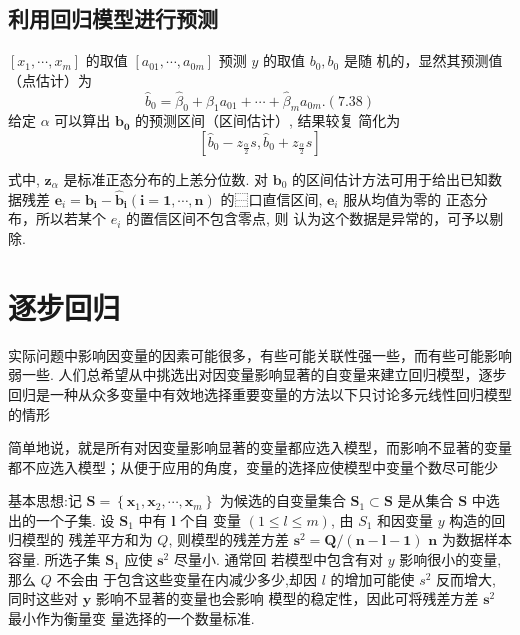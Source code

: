 \subsection{利用回归模型进行预测}

\( \left[x_{1}, \cdots, x_{m}\right] \) 的取值 \( \left[a_{01}, \cdots, a_{0 m}\right] \) 预测 \( y \) 的取值 \( b_{0}, b_{0} \) 是随 机的，显然其预测值（点估计）为
$$
\hat{b}_{0}=\hat{\beta}_{0}+\hat{\beta}_{1} a_{01}+\cdots+\hat{\beta}_{m} a_{0 m} .(7.38)
$$
给定 \( \alpha \) 可以算出 \( \boldsymbol{b}_{\mathbf{0}} \) 的预测区间（区间估计）, 结果较复
简化为
$$
\left[\hat{b}_{0}-z_{\frac{\alpha}{2}} s, \hat{b}_{0}+z_{\frac{\alpha}{2}} s\right]
$$

式中, \( \boldsymbol{z}_{\alpha} \) 是标准正态分布的上恙分位数. 
对 \( \boldsymbol{b}_{0} \) 的区间估计方法可用于给出已知数据残差 \( \boldsymbol{e}_{i}=\boldsymbol{b}_{\boldsymbol{i}}-\hat{\boldsymbol{b}}_{\boldsymbol{i}}(\boldsymbol{i}=\mathbf{1}, \cdots, \boldsymbol{n}) \) 的⿱口直信区间, \( \boldsymbol{e}_{i} \) 服从均值为零的
正态分布，所以若某个 \( e_{i} \) 的置信区间不包含零点, 则 认为这个数据是异常的，可予以剔除. 

\section{逐步回归}

实际问题中影响因变量的因素可能很多，有些可能关联性强一些，而有些可能影响弱一些. 人们总希望从中挑选出对因变量影响显著的自变量来建立回归模型，逐步回归是一种从众多变量中有效地选择重要变量的方法以下只讨论多元线性回归模型的情形

简单地说，就是所有对因变量影响显著的变量都应选入模型，而影响不显著的变量都不应选入模型；从便于应用的角度，变量的选择应使模型中变量个数尽可能少

基本思想:记 \( \boldsymbol{S}=\left\{\boldsymbol{x}_{1}, \boldsymbol{x}_{2}, \cdots, \boldsymbol{x}_{m}\right\} \) 为候选的自变量集合
\( \boldsymbol{S}_{1} \subset \boldsymbol{S} \) 是从集合 \( \boldsymbol{S} \) 中选出的一个子集. 设 \( \boldsymbol{S}_{1} \) 中有 \( \boldsymbol{l} \) 个自
变量 \( (1 \leq l \leq m) \), 由 \( S_{1} \) 和因变量 \( y \) 构造的回归模型的 残差平方和为 \( Q \), 则模型的残差方差 \( \boldsymbol{s}^{2}=\boldsymbol{Q} /(\boldsymbol{n}-\boldsymbol{l}-\mathbf{1}) \)
\( \boldsymbol{n} \) 为数据样本容量. 所选子集 \( \boldsymbol{S}_{1} \) 应使 \( \boldsymbol{s}^{2} \) 尽量小. 通常回
若模型中包含有对 \( y \) 影响很小的变量, 那么 \( Q \) 不会由 于包含这些变量在内减少多少,却因 \( l \) 的增加可能使 \( s^{2} \) 反而增大, 同时这些对 \( \boldsymbol{y} \) 影响不显著的变量也会影响 模型的稳定性，因此可将残差方差 \( \boldsymbol{s}^{2} \) 最小作为衡量变
量选择的一个数量标准. 

